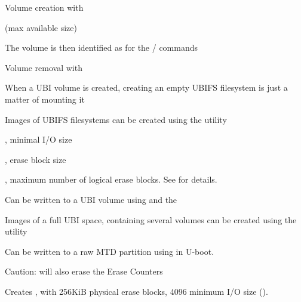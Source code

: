   \startitemize
  \item Volume creation with 
    \startitemize
    \item {}
    \item {} (max available size)
    \item The volume is then identified as  for the
      / commands
    \stopitemize
  \item Volume removal with 
    \startitemize
    \item {}
    \stopitemize
  \stopitemize

  \startitemize
  \item When a UBI volume is created, creating an empty UBIFS
    filesystem is just a matter of mounting it
    \startitemize
    \item {}
    \stopitemize
  \item Images of UBIFS filesystems can be created using the
     utility
    \startitemize
    \item {}
      \startitemize
      \item {}, minimal I/O size
      \item {}, erase block size
      \item {}, maximum number of logical erase
        blocks. See
        for details.
      \stopitemize
    \item Can be written to a UBI volume using  and
      the 
    \stopitemize
  \stopitemize

  \startitemize
  \item Images of a full UBI space, containing several volumes can be
    created using the  utility
    \startitemize
    \item Can be written to a raw MTD partition using  in U-boot.
    \item Caution:  will also erase the Erase
      Counters
    \stopitemize
  \item {}
    \startitemize
    \item Creates , with 256KiB physical erase blocks,
      4096 minimum I/O size ().
    \stopitemize
  \stopitemize

